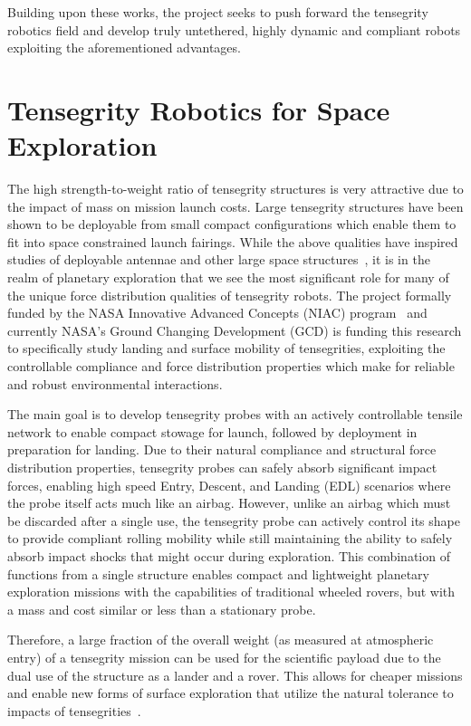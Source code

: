 Building upon these works, the \SB{} project seeks to push forward the tensegrity robotics field and develop truly untethered, highly dynamic and compliant robots exploiting the aforementioned advantages.

\section{Tensegrity Robotics for Space Exploration}
The high strength-to-weight ratio of tensegrity structures is very attractive due to the impact of mass on mission launch costs. 
Large tensegrity structures have been shown to be deployable from small compact configurations which enable them to fit into space constrained launch fairings.   
While the above qualities have inspired studies of deployable antennae and other large space structures~\cite{Tibert2002}, 
it is in the realm of planetary exploration that we see the most significant role for many of the unique force distribution qualities of tensegrity robots.  
The project formally funded by the NASA Innovative Advanced Concepts (NIAC) program~\cite{NIACfinalreport} and currently NASA's Ground Changing Development (GCD) is funding this research to specifically study landing and surface mobility of tensegrities,
exploiting the controllable compliance and force distribution properties which make for reliable and robust environmental interactions.  

The main goal is to develop tensegrity probes with an actively controllable tensile network
 to enable compact stowage for launch, followed by deployment in preparation for landing. 
Due to their natural compliance and 
structural force distribution properties, tensegrity probes can safely absorb 
significant impact forces, enabling high speed Entry, Descent, and Landing 
(EDL) scenarios where the probe itself acts much like an airbag.  However, 
unlike an airbag which must be discarded after a single use, the tensegrity 
probe can actively control its shape to provide compliant rolling mobility 
while still maintaining the ability to safely absorb impact shocks that might 
occur during exploration.  This combination of functions from a single 
structure enables compact and lightweight planetary exploration missions 
with the capabilities of traditional wheeled rovers, but with a mass and 
cost similar or less than a stationary probe.   

Therefore, a large fraction of the overall weight (as measured at atmospheric entry) of a tensegrity mission can be used for the scientific payload 
due to the dual use of the structure as a lander and a rover. 
This allows for cheaper missions and enable new forms of surface exploration that utilize the natural tolerance to impacts of tensegrities~\cite{Vytas_IPPW_2013}.

